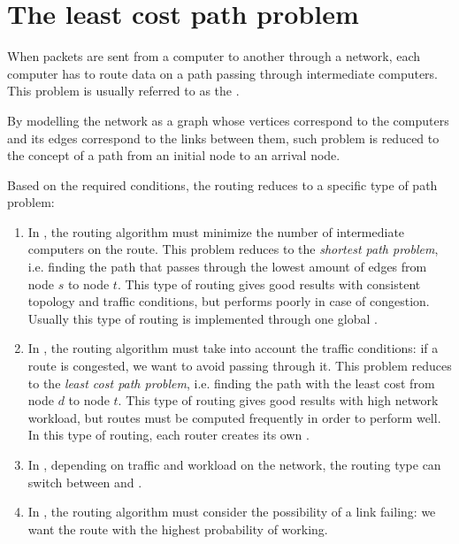 \documentclass[a4paper, 12pt]{report}
\begin{document}
    \newpage

    \section{The least cost path problem}

    When packets are sent from a computer to another through a network, each computer has to route data on a path passing through intermediate computers. This problem is usually referred to as the .
    
    By modelling the network as a graph whose vertices correspond to the computers and its edges correspond to the links between them, such problem is reduced to the concept of a path from an initial node to an arrival node.

    Based on the required conditions, the routing reduces to a specific type of path problem:
    \begin{enumerate}
        \item In , the routing algorithm must minimize the number of intermediate computers on the route. This problem reduces to the \textit{shortest path problem}, i.e. finding the path that passes through the lowest amount of edges from node $s$ to node $t$. This type of routing gives good results with consistent topology and traffic conditions, but performs poorly in case of congestion.  Usually this type of routing is implemented through one global .
        \item In , the routing algorithm must take into account the traffic conditions: if a route is congested, we want to avoid passing through it. This problem reduces to the \textit{least cost path problem}, i.e. finding the path with the least cost from node $d$ to node $t$. This type of routing gives good results with high network workload, but routes must be computed frequently in order to perform well. In this type of routing, each router creates its own .
        \item In , depending on traffic and workload on the network, the routing type can switch between  and .
        \item In , the routing algorithm must consider the possibility of a link failing: we want the route with the highest probability of working. 
    \end{enumerate}
\end{document}
